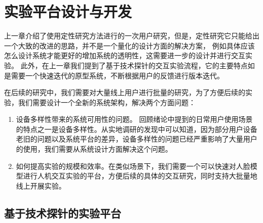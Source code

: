 \chapter{实验平台设计与开发}

上一章介绍了使用定性研究方法进行的一次用户研究，但是，定性研究它只能给出一个大致的改进的思路，并不是一个量化的设计方面的解决方案，
例如具体应该怎么设计系统才能更好的增加系统的透明性，这需要进一步的设计并进行交互实验。
此外，在上一章我们提到了基于技术探针的交互实验流程，它的主要特点如是需要一个快速迭代的原型系统，不断根据用户的反馈进行版本迭代。

在后续的研究中，我们需要对大量线上用户进行批量的研究，为了方便后续的实验，我们需要设计一个全新的系统架构，解决两个方面问题：

\begin{enumerate}
    \item 设备多样性带来的系统可用性的问题。
回顾绪论中提到的日常用户使用场景的特点之一是设备多样性。从实地调研的发现中可以知道，因为部分用户设备老旧的问题以及系统平台的差异，设备多样性的问题已经严重影响了大量用户的使用，我们需要从系统设计方面解决这个问题。

    \item 如何提高实验的规模和效率。在类似场景下，我们需要一个可以快速对人脸模型进行人机交互实验的平台，方便后续的具体的交互研究，同时支持大批量地线上开展实验。
\end{enumerate}






\section{基于技术探针的实验平台}

